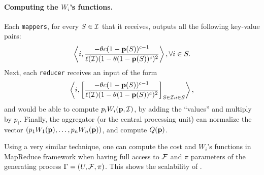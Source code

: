 \paragraph{\bf Computing  the $W_i$'s functions.}
Each \texttt{mappers}, for every $S\in \mathcal{I}$ that it receives, outputs all the following key-value pairs:
$$\left\langle i,  \frac{-\theta c (1-\mathbf{p}(S))^{c-1}}{\ell(\mathcal{I})(1-\theta(1-\mathbf{p}(S))^c)^2} \right\rangle, \forall i \in S.$$
Next, each \texttt{reducer} receives an input of the form
$$\left\langle i,  \left[\frac{-\theta c (1-\mathbf{p}(S))^{c-1}}{\ell(\mathcal{I})(1-\theta(1-\mathbf{p}(S))^c)^2}\right]_{S\in \mathcal{I}: i\in S} \right\rangle,$$
and would be able to compute $p_iW_i(\mathbf{p}, \mathcal{I})$, by adding the ``values'' and multiply by $p_i$.
Finally, the aggregator (or the central processing unit) can normalize the vector $(p_1W_1(\mathbf{p}), \ldots, p_nW_n(\mathbf{p}))$, and compute $Q(\mathbf{p})$.

Using a very similar technique, one can compute the cost and $W_i$'s functions in MapReduce framework when having full access to $\mathcal{F}$ and $\pi$ parameters of the generating process $\Gamma=(U,\mathcal{F},\pi)$. This shows the scalability of {\optimizer}.

